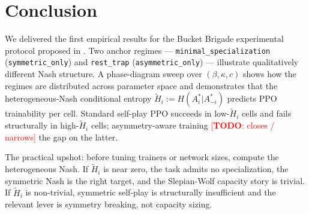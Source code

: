 \documentclass{article}
\newcommand{\TODO}[1]{\textcolor{red}{[\textbf{TODO}: #1]}}
\begin{document}
\section{Conclusion}

We delivered the first empirical results for the Bucket Brigade experimental
protocol proposed in \cite{walters2026slepianwolf}.  Two anchor regimes —
\texttt{minimal\_specialization} (\texttt{symmetric\_only}) and
\texttt{rest\_trap} (\texttt{asymmetric\_only}) — illustrate qualitatively
different Nash structure.  A phase-diagram sweep over $(\beta, \kappa, c)$
shows how the regimes are distributed across parameter space and demonstrates
that the heterogeneous-Nash conditional entropy $\tilde{H}_i := H(A_i^*|A_{-i}^*)$
predicts PPO trainability per cell.  Standard self-play PPO succeeds in
low-$\tilde{H}_i$ cells and fails structurally in high-$\tilde{H}_i$ cells;
asymmetry-aware training \TODO{closes / narrows} the gap on the latter.

The practical upshot: before tuning trainers or network sizes, compute the
heterogeneous Nash.  If $\tilde{H}_i$ is near zero, the task admits no
specialization, the symmetric Nash is the right target, and the
Slepian-Wolf capacity story is trivial.  If $\tilde{H}_i$ is non-trivial,
symmetric self-play is structurally insufficient and the relevant lever is
symmetry breaking, not capacity sizing.
\end{document}
